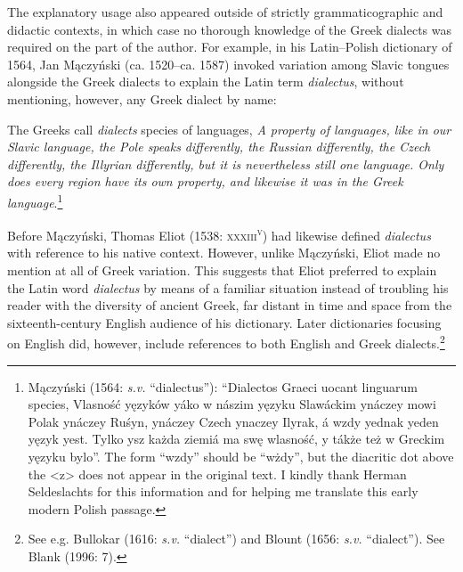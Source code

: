 \documentclass[12pt]{article}
\newenvironment{styleStandard}{\renewcommand\baselinestretch{1.25}\setlength\leftskip{0in}\setlength\rightskip{0in}\setlength\parindent{0.1972in}\setlength\parfillskip{0pt plus 1fil}\setlength\parskip{0in plus 1pt}\writerlistparindent\writerlistleftskip\leavevmode\normalfont\normalsize\writerlistlabel\ignorespaces}{\unskip\vspace{0in plus 1pt}\par}
\newenvironment{styleQuote}{\renewcommand\baselinestretch{1.25}\setlength\leftskip{0.3937in}\setlength\rightskip{0in}\setlength\parindent{0in}\setlength\parfillskip{0pt plus 1fil}\setlength\parskip{0.1665in plus 0.016649999in}\writerlistparindent\writerlistleftskip\leavevmode\normalfont\normalsize\writerlistlabel\ignorespaces}{\unskip\vspace{0.1665in plus 0.016649999in}\par}
\newcommand\writerlistleftskip{}
\newcommand\writerlistparindent{}
\newcommand\writerlistlabel{}
\begin{document}
\begin{styleStandard}
The explanatory usage also appeared outside of strictly grammaticographic and didactic contexts, in which case no thorough knowledge of the Greek dialects was required on the part of the author. For example, in his Latin–Polish dictionary of 1564, Jan Mączyński (ca. 1520–ca. 1587) invoked variation among Slavic tongues alongside the Greek dialects to explain the Latin term \textit{dialectus}\textsc{, }without mentioning, however, any Greek dialect by name:
\end{styleStandard}

\begin{styleQuote}
The Greeks call \textit{dialects} species of languages, \textit{A property of languages, like in our Slavic language, the Pole speaks differently, the Russian differently, the Czech differently, the Illyrian differently, but it is nevertheless still one language. Only does every region have its own property, and likewise it was in the Greek language}.\footnote{ Mączyński (1564: \textit{s.v.} “dialectus”): “Dialectos Graeci uocant linguarum species, Vlasność yęzyków yáko w nászim yęzyku Slawáckim ynáczey mowi Polak ynáczey Ruśyn, ynáczey Czech ynaczey Ilyrak, á wzdy yednak yeden yęzyk yest. Tylko ysz każda ziemiá ma swę wlasność, y tákże też w Greckim yęzyku bylo”. The form “wzdy” should be “wżdy”, but the diacritic dot above the {\textless}z{\textgreater} does not appear in the original text. I kindly thank Herman Seldeslachts for this information and for helping me translate this early modern Polish passage.}
\end{styleQuote}

\begin{styleStandard}
Before Mączyński, Thomas Eliot (1538: \textsc{xxxiii}\textsc{\textsuperscript{v}}) had likewise defined \textit{dialectus} with reference to his native context. However, unlike Mączyński, Eliot made no mention at all of Greek variation. This suggests that Eliot preferred to explain the Latin word \textit{dialectus} by means of a familiar situation instead of troubling his reader with the diversity of ancient Greek, far distant in time and space from the sixteenth-century English audience of his dictionary. Later dictionaries focusing on English did, however, include references to both English and Greek dialects.\footnote{ See e.g. Bullokar (1616: \textit{s.v.} “dialect”) and Blount (1656: \textit{s.v.} “dialect”). See Blank (1996: 7).}
\end{styleStandard}
\end{document}
